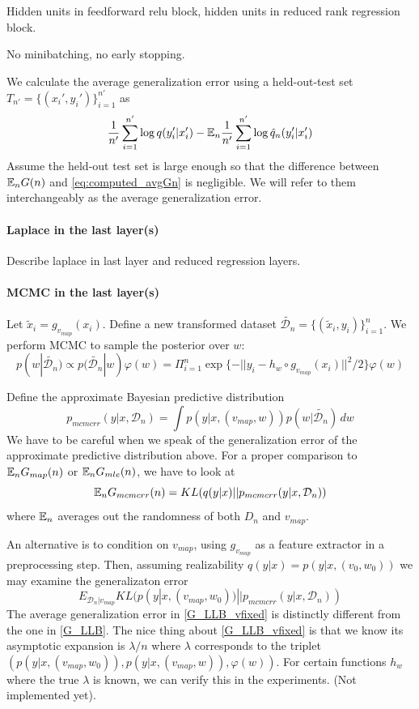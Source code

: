 \documentclass{article} %
\begin{document}
Hidden units in feedforward relu block, hidden units in reduced rank regression block.

No minibatching, no early stopping.


We calculate the average generalization error using a held-out-test set $T_{n'} = \{(x_i',y_i')\}_{i=1}^{n'}$ as
\begin{equation}
\frac{1}{n'} \sum_{i=1}^{n'} \log q(y_i'|x_i') - {\mathbb{E}}_n \frac{1}{n'} \sum_{i=1}^{n'} \log \hat q_n(y_i'|x_i')
\label{eq:computed_avgGn}
\end{equation}
Assume the held-out test set is large enough so that the difference between ${\mathbb{E}}_n G(n)$ and \eqref{eq:computed_avgGn} is negligible. We will refer to them interchangeably as the average generalization error. 

\paragraph{Laplace in the last layer(s)}
Describe laplace in last layer and reduced regression layers.


\paragraph{MCMC in the last layer(s)}
 Let $\tilde x_i = g_{v_{map}}(x_i)$. Define a new transformed dataset $\tilde{\mathcal D_n} = \{(\tilde x_i, y_i) \}_{i=1}^n$. We perform MCMC to sample the posterior over $w$:
$$
p(w | \tilde{\mathcal D_n}) \propto p(\tilde{\mathcal D_n} | w) \varphi(w) = \Pi_{i=1}^n \exp\{-|| y_i - h_w \circ g_{v_{map}}(x_i) ||^2/2\} \varphi(w)
$$

Define the approximate Bayesian predictive distribution
$$
p_{mcmcrr}(y|x, \mathcal D_n) = \int p(y|x,(v_{map},w)) p(w|\tilde{\mathcal D_n}) \,dw
$$
We have to be careful when we speak of the generalization error of the approximate predictive distribution above. For a proper comparison to ${\mathbb{E}}_n G_{map}(n)$ or ${\mathbb{E}}_n G_{mle}(n)$, we have to look at 
\begin{equation}
{\mathbb{E}}_n G_{mcmcrr}(n) =  KL (q(y|x) || p_{mcmcrr}(y|x, \mathcal D_n) )
\label{G_LLB}
\end{equation}
where ${\mathbb{E}}_n$ averages out the randomness of both $D_n$ and  $v_{map}$. 

An alternative is to condition on $v_{map}$, using $g_{v_{map}}$ as a feature extractor in a preprocessing step. Then, assuming realizability $q(y|x) = p(y|x,(v_0,w_0))$ we may examine the generalizaton error
\begin{equation}
E_{\mathcal D_n | v_{map}} KL( p(y|x,(v_{map},w_0)) || p_{mcmcrr}(y|x, \mathcal D_n) )
\label{G_LLB_vfixed}
\end{equation}
The average generalization error in \eqref{G_LLB_vfixed} is distinctly different from the one in \eqref{G_LLB}. The nice thing about \eqref{G_LLB_vfixed} is that we know its asymptotic expansion is $\lambda/n$ where $\lambda$ corresponds to the triplet $( p(y|x,(v_{map},w_0)), p(y| x, (v_{map},w)), \varphi(w))$. For certain functions $h_w$ where the true $\lambda$ is known, we can verify this in the experiments. (Not implemented yet).
\end{document}
